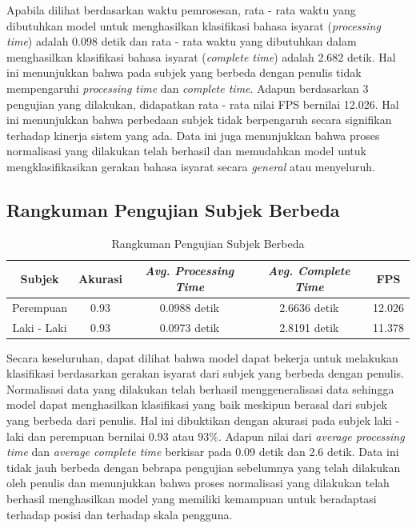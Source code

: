 Apabila dilihat berdasarkan waktu pemrosesan, rata - rata waktu yang dibutuhkan model untuk menghasilkan klasifikasi bahasa isyarat (\emph{processing time}) adalah 0.098 detik dan rata - rata waktu yang dibutuhkan dalam menghasilkan klasifikasi bahasa isyarat (\emph{complete time}) adalah 2.682 detik. Hal ini menunjukkan bahwa pada subjek yang berbeda dengan penulis tidak mempengaruhi \emph{processing time} dan \emph{complete time}. Adapun berdasarkan 3 pengujian yang dilakukan, didapatkan rata - rata nilai FPS bernilai 12.026. Hal ini menunjukkan bahwa perbedaan subjek tidak berpengaruh secara signifikan terhadap kinerja sistem yang ada. Data ini juga menunjukkan bahwa proses normalisasi yang dilakukan telah berhasil dan memudahkan model untuk mengklasifikasikan gerakan bahasa isyarat secara \emph{general} atau menyeluruh.  

\subsection{Rangkuman Pengujian Subjek Berbeda}
\label{sec:analisissubjekberbeda}

\begin{longtable}{|c|c|c|c|c|}
  \caption{Rangkuman Pengujian Subjek Berbeda}
  \label{tb:evaluasiSubjek}                                   \\
  \hline
  \rowcolor[HTML]{C0C0C0}
  \textbf{Subjek} & \textbf{Akurasi} & \emph{\textbf{Avg. Processing Time}} & \emph{\textbf{Avg. Complete Time}} & \textbf{FPS} \\
  \hline
  Perempuan & 0.93   & 0.0988 detik & 2.6636 detik & 12.026  \\
  Laki - Laki & 0.93 & 0.0973 detik & 2.8191 detik & 11.378 \\
  \hline
\end{longtable}

Secara keseluruhan, dapat dilihat bahwa model dapat bekerja untuk melakukan klasifikasi berdasarkan gerakan isyarat dari subjek yang berbeda dengan penulis. Normalisasi data yang dilakukan telah berhasil menggeneralisasi data sehingga model dapat menghasilkan klasifikasi yang baik meskipun berasal dari subjek yang berbeda dari penulis. Hal ini dibuktikan dengan akurasi pada subjek laki - laki dan perempuan bernilai 0.93 atau 93\%. Adapun nilai dari \emph{average processing time} dan \emph{average complete time} berkisar pada 0.09 detik dan 2.6 detik. Data ini tidak jauh berbeda dengan bebrapa pengujian sebelumnya yang telah dilakukan oleh penulis dan menunjukkan bahwa proses normalisasi yang dilakukan telah berhasil menghasilkan model yang memiliki kemampuan untuk beradaptasi terhadap posisi dan terhadap skala pengguna.

